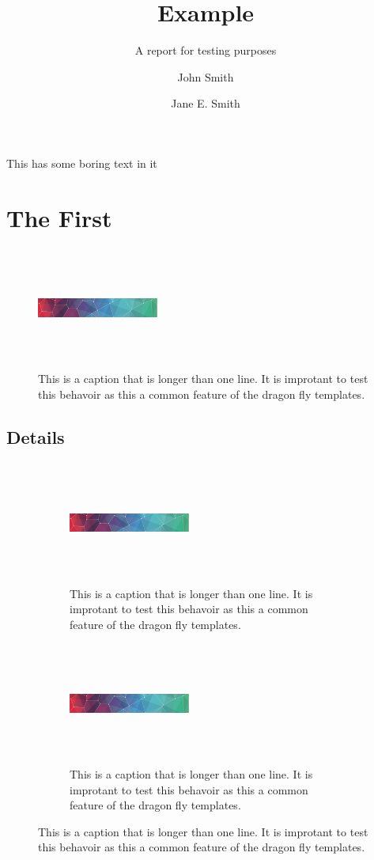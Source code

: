 \documentclass{dragonfly-report}
\title{Example}{An Example\\ Report about \emph{sheep}}
\subtitle{A report for testing purposes}
\author{John Smith \and Jane E. Smith}
\begin{document}
\maketitle
\tableofcontents

\summary%
This has some boring text in it

\section{The First}
\lipsum[1]


\begin{figure}[h]
  \includegraphics[width=40mm,height=40mm]{pattern}
  \caption{This is a caption that is longer than one line. It is improtant to test 
  this behavoir as this a common feature of the dragon fly templates.}
\end{figure}

\subsection{Details}

\lipsum[2]


\begin{figure}[h]

  \begin{subfigure}{0.45\textwidth}
  \includegraphics[width=40mm,height=40mm]{pattern}
  \caption{This is a caption that is longer than one line. It is improtant to test 
  this behavoir as this a common feature of the dragon fly templates.}
\end{subfigure}\qquad
  \begin{subfigure}{0.45\textwidth}
  \includegraphics[width=40mm,height=40mm]{pattern}
  \caption{This is a caption that is longer than one line. It is improtant to test 
  this behavoir as this a common feature of the dragon fly templates.}
\end{subfigure}
\end{figure}
\end{document}
